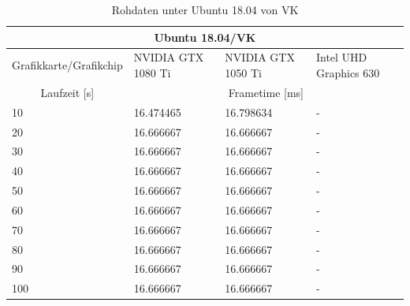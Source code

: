 \documentclass[titlepage, 11pt, a4paper, ngerman]{article}
\begin{document}
\begin{table}[ht]
    \centering
    \caption[Rohdaten unter Ubuntu 18.04 von VK]{Rohdaten unter Ubuntu 18.04 von VK}
    \bigbreak
    \begin{tabular}{|p{4cm}||p{2.5cm}|p{2.5cm}|p{3cm}|}
    \hline
    \multicolumn{4}{|c|}{Ubuntu 18.04/VK} \\
    \hline
    Grafikkarte/Grafikchip & NVIDIA GTX 1080 Ti & NVIDIA GTX 1050 Ti & Intel UHD Graphics 630 \\
    \hline
    \hline
    \multicolumn{1}{|c||}{Laufzeit [s]} & \multicolumn{3}{|c|}{\gls{Frametime} [ms]} \\
    \hline
    10 & 16.474465 & 16.798634 & - \\
    \hline
    20 & 16.666667 & 16.666667 & - \\
    \hline
    30 & 16.666667 & 16.666667 & - \\
    \hline
    40 & 16.666667 & 16.666667 & - \\
    \hline
    50 & 16.666667 & 16.666667 & - \\
    \hline
    60 & 16.666667 & 16.666667 & - \\
    \hline
    70 & 16.666667 & 16.666667 & - \\
    \hline
    80 & 16.666667 & 16.666667 & - \\
    \hline
    90 & 16.666667 & 16.666667 & - \\
    \hline
    100 & 16.666667 & 16.666667 & - \\
    \hline
    \end{tabular}
    \label{Tab:results-raw-ubuntu-vk}
\end{table}
\end{document}
